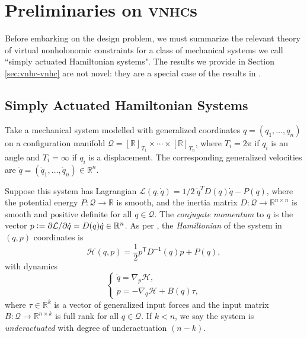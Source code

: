 \documentclass[journal,twoside,web, twocolumn,draftcls]{ieeecolor}
\newcommand*{\tpose}{^\mathsf{T}}
\newcommand*{\inv}{^\mathsf{-1}}
\newcommand*{\Rt}[1]{[\R]_{#1}}
\newcommand*{\R}{\mathbb{R}}
\newcommand*{\eqdef}{\vcentcolon=}
\newcommand*{\vnhc}{\textsc{vnhc}\xspace}
\newcommand*{\vnhcs}{\textsc{vnhc}s\xspace}
\begin{document}
\section{Preliminaries on \vnhcs}\label{sec:vnhc}
Before embarking on the design problem, we must summarize the relevant
theory of virtual nonholonomic constraints for a class of mechanical systems we
call ``simply actuated Hamiltonian systems". 
The results we provide in Section \ref{sec:vnhc-vnhc} are not novel:
they are a special case of the results in
\cite{hybrid_zero_dynamics_bipedal_nhvcs}.

\subsection{Simply Actuated Hamiltonian Systems} \label{sec:vnhc-sah}
Take a mechanical system modelled with generalized coordinates 
\(q = (q_1, \ldots, q_n)\) on a configuration manifold
\(\mathcal{Q} = \Rt{T_1} \times \cdots \times \Rt{T_n}\), where
\(T_i = 2\pi\) if \(q_i\) is an angle and \(T_i = \infty\) if \(q_i\) is a
displacement. The corresponding generalized velocities are 
\(\dot{q} = (\dot{q}_1,\ldots,\dot{q}_n) \in \R^n\).

Suppose this system has Lagrangian
\(\mathcal{L}(q,\dot{q}) = 1/2~\dot{q}^T D(q) \dot{q} - P(q)\),
where the potential energy 
\(P : \mathcal{Q} \rightarrow \mathbb{R}\) 
is smooth, and the inertia matrix 
\(D : \mathcal{Q} \rightarrow \mathbb{R}^{n \times n}\)
is smooth and positive definite for all \(q \in \mathcal{Q}\).
The \textit{conjugate momentum} to \(q\) is the vector
\(p \eqdef \partial\mathcal{L}/\partial\dot{q} = D(q) \dot{q} \in \R^n\).
As per \cite{landau_mechanics}, 
the \textit{Hamiltonian} of the system in \((q,p)\) coordinates
is
\begin{equation}\label{eqn:hamiltonian}
    \mathcal{H}(q,p) = \frac{1}{2} p\tpose D\inv(q) p + P(q)
    ,
\end{equation}
with dynamics
\begin{equation}\label{eqn:hamiltonian-eom-general}
    \begin{cases}
        \dot{q} = \nabla_p\mathcal{H} 
        , \\
        \dot{p} = -\nabla_q\mathcal{H} + B(q) \tau
        ,
    \end{cases}
\end{equation}
where \(\tau \in \R^k\) is a vector of generalized input forces and the input
matrix \(B : \mathcal{Q} \rightarrow \R^{n \times k}\) is full rank for all 
\(q \in \mathcal{Q}\).
If \(k < n\), we say the system is \textit{underactuated} with degree of
underactuation \((n-k)\).
\end{document}
